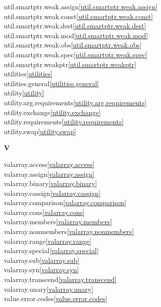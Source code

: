 \begin{multicols}{2}
util.smartptr.weak.assign\quad\ref{util.smartptr.weak.assign}\\
util.smartptr.weak.const\quad\ref{util.smartptr.weak.const}\\
util.smartptr.weak.dest\quad\ref{util.smartptr.weak.dest}\\
util.smartptr.weak.mod\quad\ref{util.smartptr.weak.mod}\\
util.smartptr.weak.obs\quad\ref{util.smartptr.weak.obs}\\
util.smartptr.weak.spec\quad\ref{util.smartptr.weak.spec}\\
util.smartptr.weakptr\quad\ref{util.smartptr.weakptr}\\
utilities\quad\ref{utilities}\\
utilities.general\quad\ref{utilities.general}\\
utility\quad\ref{utility}\\
utility.arg.requirements\quad\ref{utility.arg.requirements}\\
utility.exchange\quad\ref{utility.exchange}\\
utility.requirements\quad\ref{utility.requirements}\\
utility.swap\quad\ref{utility.swap}\\
\par \textbf{V}\par
valarray.access\quad\ref{valarray.access}\\
valarray.assign\quad\ref{valarray.assign}\\
valarray.binary\quad\ref{valarray.binary}\\
valarray.cassign\quad\ref{valarray.cassign}\\
valarray.comparison\quad\ref{valarray.comparison}\\
valarray.cons\quad\ref{valarray.cons}\\
valarray.members\quad\ref{valarray.members}\\
valarray.nonmembers\quad\ref{valarray.nonmembers}\\
valarray.range\quad\ref{valarray.range}\\
valarray.special\quad\ref{valarray.special}\\
valarray.sub\quad\ref{valarray.sub}\\
valarray.syn\quad\ref{valarray.syn}\\
valarray.transcend\quad\ref{valarray.transcend}\\
valarray.unary\quad\ref{valarray.unary}\\
value.error.codes\quad\ref{value.error.codes}\\

\end{multicols}
